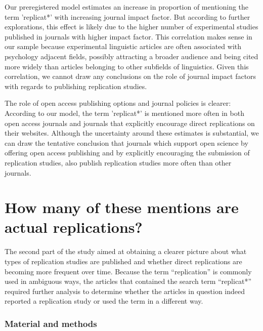 \documentclass[]{elsarticle} %
\begin{document}
Our preregistered model estimates an increase in proportion of
mentioning the term 'replicat*' with increasing journal impact factor.
But according to further explorations, this effect is likely due to the
higher number of experimental studies published in journals with higher
impact factor. This correlation makes sense in our sample because
experimental linguistic articles are often associated with psychology
adjacent fields, possibly attracting a broader audience and being cited
more widely than articles belonging to other subfields of linguistics.
Given this correlation, we cannot draw any conclusions on the role of
journal impact factors with regards to publishing replication studies.

The role of open access publishing options and journal policies is
clearer: According to our model, the term 'replicat*' is mentioned more
often in both open access journals and journals that explicitly
encourage direct replications on their websites. Although the
uncertainty around these estimates is substantial, we can draw the
tentative conclusion that journals which support open science by
offering open access publishing and by explicitly encouraging the
submission of replication studies, also publish replication studies more
often than other journals.

\hypertarget{how-many-of-these-mentions-are-actual-replications}{%
\section{How many of these mentions are actual
replications?}\label{how-many-of-these-mentions-are-actual-replications}}

The second part of the study aimed at obtaining a clearer picture about
what types of replication studies are published and whether direct
replications are becoming more frequent over time. Because the term
``replication'' is commonly used in ambiguous ways, the articles that
contained the search term ``replicat*'' required further analysis to
determine whether the articles in question indeed reported a replication
study or used the term in a different way.

\hypertarget{material-and-methods-1}{%
\subsubsection{Material and methods}\label{material-and-methods-1}}
\end{document}
